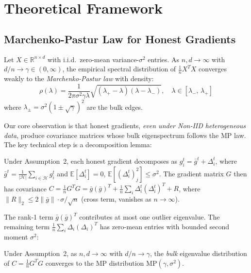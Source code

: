 \section{Theoretical Framework}
\label{sec:theory}

\subsection{Marchenko-Pastur Law for Honest Gradients}

\begin{definition}
Let $X \in \mathbb{R}^{n \times d}$ with i.i.d.\ zero-mean variance-$\sigma^2$ entries.
As $n,d \to \infty$ with $d/n \to \gamma \in (0,\infty)$, the empirical spectral distribution
of $\frac{1}{n}X^TX$ converges weakly to the \emph{Marchenko-Pastur law} with density:
\begin{equation}
\rho(\lambda) = \frac{1}{2\pi\sigma^2\gamma\lambda}
  \sqrt{(\lambda_+ - \lambda)(\lambda - \lambda_-)},
  \quad \lambda \in [\lambda_-,\, \lambda_+]
\end{equation}
where $\lambda_{\pm} = \sigma^2(1 \pm \sqrt{\gamma})^2$ are the bulk edges.
\end{definition}

Our core observation is that honest gradients, \emph{even under Non-IID heterogeneous data},
produce covariance matrices whose bulk eigenspectrum follows the MP law.
The key technical step is a decomposition lemma:

\begin{lemma}
\label{lem:noniid}
Under Assumption~2, each honest gradient decomposes as $g_i^t = \bar{g}^t + \Delta_i^t$,
where $\bar{g}^t = \frac{1}{|\mathcal{H}|}\sum_{i \in \mathcal{H}} g_i^t$ and
$\mathbb{E}[\Delta_i^t] = 0$, $\mathbb{E}[(\Delta_i^t)_j^2] \leq \sigma^2$.
The gradient matrix $G$ then has covariance
$C = \frac{1}{n}G^TG = \bar{g}(\bar{g})^T + \frac{1}{n}\sum_i \Delta_i^t(\Delta_i^t)^T + R$,
where $\|R\|_2 \leq 2\|\bar{g}\| \cdot \sigma/\sqrt{n}$ (cross term, vanishes as $n \to \infty$).
\end{lemma}

The rank-1 term $\bar{g}(\bar{g})^T$ contributes at most one outlier eigenvalue.
The remaining term $\frac{1}{n}\sum_i \Delta_i(\Delta_i)^T$ has zero-mean entries with
bounded second moment $\sigma^2$:

\begin{theorem}
\label{thm:mp_honest}
Under Assumption~2, as $n, d \to \infty$ with $d/n \to \gamma$, the \emph{bulk}
eigenvalue distribution of $C = \frac{1}{n}G^TG$ converges to the MP distribution
$\mathrm{MP}(\gamma, \sigma^2)$.
\end{theorem}


